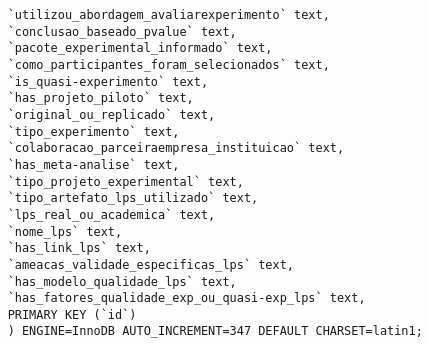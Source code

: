 \begin{scriptsize}
\begin{verbatim}
	`utilizou_abordagem_avaliarexperimento` text,
	`conclusao_baseado_pvalue` text,
	`pacote_experimental_informado` text,
	`como_participantes_foram_selecionados` text,
	`is_quasi-experimento` text,
	`has_projeto_piloto` text,
	`original_ou_replicado` text,
	`tipo_experimento` text,
	`colaboracao_parceiraempresa_instituicao` text,
	`has_meta-analise` text,
	`tipo_projeto_experimental` text,
	`tipo_artefato_lps_utilizado` text,
	`lps_real_ou_academica` text,
	`nome_lps` text,
	`has_link_lps` text,
	`ameacas_validade_especificas_lps` text,
	`has_modelo_qualidade_lps` text,
	`has_fatores_qualidade_exp_ou_quasi-exp_lps` text,
	PRIMARY KEY (`id`)
	) ENGINE=InnoDB AUTO_INCREMENT=347 DEFAULT CHARSET=latin1;
	\end{verbatim}
\end{scriptsize}

%
%
%	

